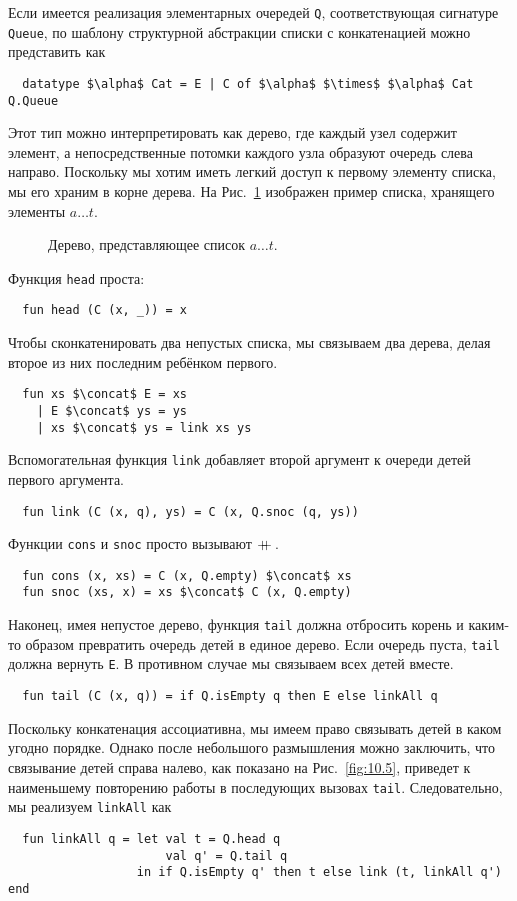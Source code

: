 Если имеется реализация элементарных очередей \lstinline!Q!,
соответствующая сигнатуре \lstinline!Queue!, по шаблону
структурной абстракции списки с конкатенацией можно представить как
\begin{lstlisting}
  datatype $\alpha$ Cat = E | C of $\alpha$ $\times$ $\alpha$ Cat Q.Queue
\end{lstlisting}
Этот тип можно интерпретировать как дерево, где каждый узел содержит
элемент, а непосредственные потомки каждого узла образуют очередь
слева направо.  Поскольку мы хотим иметь легкий доступ к первому
элементу списка, мы его храним в корне дерева. На Рис.~\ref{fig:10.4}
изображен пример списка, хранящего элементы $a \ldots t$.

\begin{figure}
  \centering
  
  \caption{Дерево, представляющее список $a \ldots t$.}
  \label{fig:10.4}
\end{figure}

Функция \lstinline!head! проста:
\begin{lstlisting}
  fun head (C (x, _)) = x
\end{lstlisting}
Чтобы сконкатенировать два непустых списка, мы связываем два дерева,
делая второе из них последним ребёнком первого.
\begin{lstlisting}
  fun xs $\concat$ E = xs
    | E $\concat$ ys = ys
    | xs $\concat$ ys = link xs ys
\end{lstlisting}
Вспомогательная функция \lstinline!link! добавляет второй аргумент к
очереди детей первого аргумента.
\begin{lstlisting}
  fun link (C (x, q), ys) = C (x, Q.snoc (q, ys))
\end{lstlisting}
Функции \lstinline!cons! и \lstinline!snoc! просто вызывают $+\!\!\!+\,$.
\begin{lstlisting}
  fun cons (x, xs) = C (x, Q.empty) $\concat$ xs
  fun snoc (xs, x) = xs $\concat$ C (x, Q.empty)
\end{lstlisting}
Наконец, имея непустое дерево, функция \lstinline!tail! должна
отбросить корень и каким-то образом превратить очередь детей в единое
дерево. Если очередь пуста, \lstinline!tail! должна вернуть
\lstinline!E!. В противном случае мы связываем всех детей вместе.
\begin{lstlisting}
  fun tail (C (x, q)) = if Q.isEmpty q then E else linkAll q
\end{lstlisting}
Поскольку конкатенация ассоциативна, мы имеем право связывать детей в
каком угодно порядке. Однако после небольшого размышления можно
заключить, что связывание детей справа налево, как показано на
Рис.~\ref{fig:10.5}, приведет к наименьшему повторению работы в
последующих вызовах \lstinline!tail!. Следовательно, мы реализуем
\lstinline!linkAll! как
\begin{lstlisting}
  fun linkAll q = let val t = Q.head q
                      val q' = Q.tail q
                  in if Q.isEmpty q' then t else link (t, linkAll q') end
\end{lstlisting}

